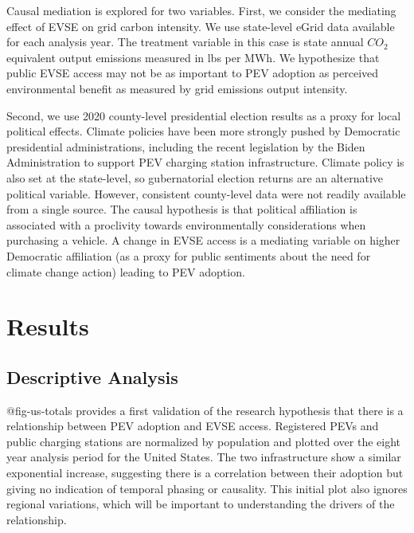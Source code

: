 \documentclass[
  letterpaper,
  DIV=11,
  numbers=noendperiod]{scrartcl}
\begin{document}
Causal mediation is explored for two variables. First, we consider the
mediating effect of EVSE on grid carbon intensity. We use state-level
eGrid data available for each analysis year. The treatment variable in
this case is state annual \(CO_2\) equivalent output emissions measured
in lbs per MWh. We hypothesize that public EVSE access may not be as
important to PEV adoption as perceived environmental benefit as measured
by grid emissions output intensity.

Second, we use 2020 county-level presidential election results as a
proxy for local political effects. Climate policies have been more
strongly pushed by Democratic presidential administrations, including
the recent legislation by the Biden Administration to support PEV
charging station infrastructure. Climate policy is also set at the
state-level, so gubernatorial election returns are an alternative
political variable. However, consistent county-level data were not
readily available from a single source. The causal hypothesis is that
political affiliation is associated with a proclivity towards
environmentally considerations when purchasing a vehicle. A change in
EVSE access is a mediating variable on higher Democratic affiliation (as
a proxy for public sentiments about the need for climate change action)
leading to PEV adoption.

\hypertarget{results}{%
\section{Results}\label{results}}

\hypertarget{descriptive-analysis}{%
\subsection{Descriptive Analysis}\label{descriptive-analysis}}

@fig-us-totals provides a first validation of the research hypothesis
that there is a relationship between PEV adoption and EVSE access.
Registered PEVs and public charging stations are normalized by
population and plotted over the eight year analysis period for the
United States. The two infrastructure show a similar exponential
increase, suggesting there is a correlation between their adoption but
giving no indication of temporal phasing or causality. This initial plot
also ignores regional variations, which will be important to
understanding the drivers of the relationship.
\end{document}
